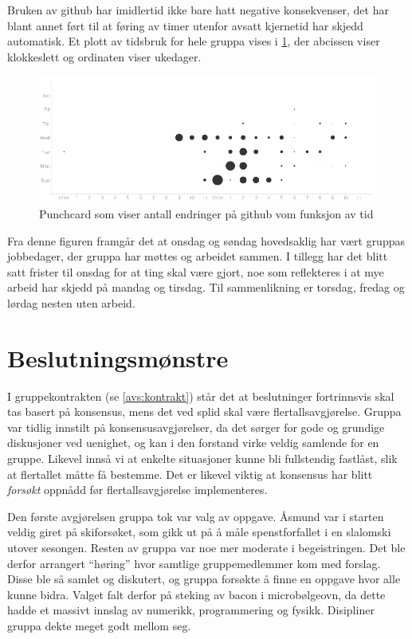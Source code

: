 Bruken av github har imidlertid ikke bare hatt negative konsekvenser, det har blant annet
ført til at føring av timer utenfor avsatt kjernetid har skjedd automatisk. Et
plott av tidsbruk for hele gruppa vises i \cref{fig:punchcard}, der abcissen
viser klokkeslett og ordinaten viser ukedager.
\begin{figure}[ht!]
  \begin{center}
    \includegraphics[width=\textwidth]{punchcard.png}
  \end{center}
  \caption{Punchcard som viser antall endringer på github vom funksjon av tid}
  \label{fig:punchcard}
\end{figure}
Fra denne figuren framgår det at onsdag og søndag hovedsaklig har vært gruppas
jobbedager, der gruppa har møttes og arbeidet sammen. I tillegg har det blitt satt
frister til onsdag for at ting skal være gjort, noe som reflekteres i at mye
arbeid har skjedd på mandag og tirsdag. Til sammenlikning er torsdag, fredag og
lørdag nesten uten arbeid.

\section{Beslutningsmønstre}
I gruppekontrakten (se \cref{avs:kontrakt}) står det at beslutninger fortrinnsvis
skal tas basert på konsensus, mens det ved splid skal være flertallsavgjørelse.
Gruppa var tidlig innstilt på konsensusavgjørelser, da det sørger for gode og
grundige diskusjoner ved uenighet, og kan i den forstand virke veldig samlende
for en gruppe. Likevel innså vi at enkelte situasjoner kunne bli fullstendig
fastlåst, slik at flertallet måtte få bestemme. Det er likevel viktig at
konsensus har blitt \emph{forsøkt} oppnådd før flertallsavgjørelse
implementeres. 

Den første avgjørelsen gruppa tok var valg av oppgave. Åsmund var i starten
veldig giret på skiforsøket, som gikk ut på å måle spenstforfallet i en
slalomski utover sesongen. Resten av gruppa var noe mer moderate i
begeistringen. Det ble derfor arrangert ``høring'' hvor samtlige gruppemedlemmer
kom med forslag. Disse ble så samlet og diskutert, og gruppa forsøkte å finne en
oppgave hvor alle kunne bidra. Valget falt derfor på steking av bacon i
microbølgeovn, da dette hadde et massivt innslag av numerikk, programmering og
fysikk. Disipliner gruppa dekte meget godt mellom seg. 

